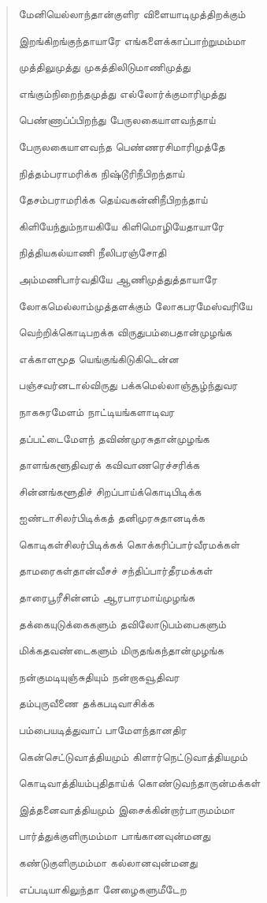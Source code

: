 \documentclass{article}
\begin{document}
\begin{quotation}
{மேனியெல்லாந்தான்குளிர விளையாடிமுத்திறக்கும்

இறங்கிறங்குந்தாயாரே எங்களைக்காப்பாற்றுமம்மா

முத்திலுமுத்து முகத்திலிடுமாணிமுத்து

எங்கும்நிறைந்தமுத்து எல்லாேர்க்குமாரிமுத்து

பெண்ணாப்ப்பிறந்து பேருலகையாளவந்தாய்

பேருலகையாளவந்த பெண்ணரசிமாரிமுத்தே

நித்தம்பராமரிக்க நிஷ்டூரிநீபிறந்தாய்

தேசம்பராமரிக்க தெய்வகன்னிநீபிறந்தாய்

கிளியேந்தும்நாயகியே கிளிமொழியேதாயாரே

நித்தியகல்யாணி நீலிபரஞ்சோதி

அம்மணிபார்வதியே ஆணிமுத்துத்தாயாரே

லோகமெல்லாம்முத்தளக்கும் லோகபரமேஸ்வரியே

வெற்றிக்கொடிபறக்க விருதுபம்பைதான்முழங்க

எக்காளமூத யெங்குங்கிடுகிடென்ன

பஞ்சவர்னடால்விருது பக்கமெல்லாஞ்சூழ்ந்துவர

நாகசுரமேளம் நாட்டியங்களாடிவர

தப்பட்டைமேளந் தவிண்முரசுதான்முழங்க

தாளங்களூதிவரக் கவிவாணரெச்சரிக்க

சின்னங்களூதிச் சிறப்பாய்க்கொடிபிடிக்க

ஐண்டாசிலர்பிடிக்கத் தனிமுரசுதானடிக்க

கொடிகள்சிலர்பிடிக்கக் கொக்கரிப்பார்வீரமக்கள்

தாமரைகள்தான்வீசச் சந்திப்பார்தீரமக்கள்

தாரைபூரீசின்னம் ஆரபாரமாய்முழங்க

தக்கையுடுக்கைகளும் தவிலோடுபம்பைகளும்

மிக்கதவண்டைகளும் மிருதங்கந்தான்முழங்க

நன்குமடியுஞ்சுதியும் நன்றாகவூதிவர

தம்புருவீணை தக்கபடிவாசிக்க

பம்பையடித்துவாப் பாமேளந்தானதிர

கென்செட்டுவாத்தியமும் கிளார்நெட்டுவாத்தியமும்

கொடிவாத்தியம்புதிதாய்க் கொண்டுவந்தாருன்மக்கள்

இத்தனைவாத்தியமும் இசைக்கின்றார்பாருமம்மா

பார்த்துக்குளிருமம்மா பாங்கானவுன்மனது

கண்டுகுளிருமம்மா கல்லானவுன்மனது

எப்படியாகிலுந்தா னேழைகளுமீடேற

}
\end{quotation}
\end{document}
